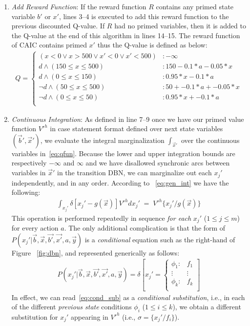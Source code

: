 \documentclass[twoside,11pt]{article}
\begin{document}
\begin{enumerate}
\item {\it Add Reward Function}: If the reward function $R$ contains any primed state variable $b'$ or $x'$, lines 3--4 is executed to add this reward function to the previous discounted Q-value. If $R$ had no primed variables, then it is added to the Q-value at the end of this algorithm in lines 14--15. The reward function of \textsc{CAIC} contains primed $x'$ thus the Q-value is defined as below: 
\vspace{-1mm}
\begin{align}
Q = \begin{cases}
(x < 0 \vee x>500 \vee x'<0 \vee x'<500) &: -\infty \\
d \land (150 \leq x \leq 500) &:  150 - 0.1 * a - 0.05 * x \\
d \land (0 \leq x \leq 150) &:  0.95 * x - 0.1 * a \\
\neg d \land (50 \leq x \leq 500) &: 50 + -0.1 * a+ -0.05 * x \\
\neg d \land (0 \leq x \leq 50) &:  0.95 * x + -0.1 * a\\
\end{cases} \nonumber
\end{align}
\item {\it Continuous Integration}: As defined in line 7--9 once we have our primed value
function $V'^{h}$ in case statement format defined over next state
variables $(\vec{b}',\vec{x}')$, we evaluate the integral
marginalization $\int_{\vec{x}'}$ over the continuous variables
in~\eqref{eq:qfun}.  Because the lower and upper integration bounds
are respectively $-\infty$ and $\infty$
and we have disallowed synchronic arcs between variables in $\vec{x}'$ 
in the transition DBN, we can marginalize out each
$x_j'$ independently, and in any order. According to ~\ref{eq:gen_int} we have the following: 
\begin{align*}
\int_{x_j'} \delta[x_j' - g(\vec{x})] V'^{h} dx_j' \; = \; V'^{h} \{x_j' / g(\vec{x}) \}  %
\end{align*}
This
operation is performed repeatedly in sequence \emph{for each}
$x_j'$ ($1 \leq j \leq m$) for every action $a$.  The only
additional complication is that the form of 
$P(x_j'|\vec{b},\vec{x},\vec{b'},\vec{x'},a,\vec{y})$ is a \emph{conditional} 
equation such as the right-hand of Figure ~\ref{fig:dbn}, and represented generically
as follows:
\begin{align}
   P(x_j'|\vec{b},\vec{x},\vec{b'},\vec{x'},a,\vec{y}) = \delta\left[ x_j' = \begin{cases}
    \phi_1: & f_1 \\ 
   \vdots&\vdots\\ 
    \phi_k: & f_k \\ 
  \end{cases} \right] \label{eq:cond_sub}
\end{align}
In effect, we can read~\eqref{eq:cond_sub} as a \emph{conditional
substitution}, i.e., in each of the different \emph{previous state}
conditions $\phi_i$ ($1 \leq i \leq k$), we obtain a different
substitution for $x_j'$ appearing in $V'^{h}$ (i.e., $\sigma = \{ x_j' / f_i
\}$). 


\end{enumerate}
\end{document}
